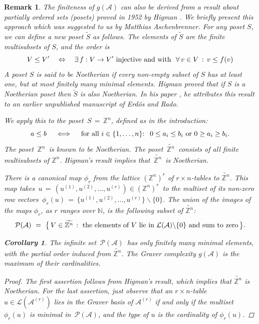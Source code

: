 \documentclass[11pt]{amsart}
\newtheorem{remark}[theorem]{Remark}
\newtheorem{corollary}[theorem]{Corollary}
\theoremstyle{definition}
\newcommand{\naturals}{{\mathbb N}}
\newcommand{\integers}{{\mathbb Z}}
\renewcommand{\L}{{\mathcal L}}
\renewcommand{\P}{{\mathcal P}}
\newcommand{\A}{{\mathcal A}}
\begin{document}
\begin{remark}
\rm
The finiteness of $g(\A)$ can also be
derived from a result about partially ordered
sets (posets) proved in 1952 by Higman \cite[Theorem 4.2]{Hig}.
We briefly present this approach which was suggested to us by
Matthias Aschenbrenner.
For any poset $S$, we can define a new poset
$\widetilde S$  as follows. The elements of $\widetilde S$
are the finite multisubsets of $S$, and the order is
  \begin{equation}
  \label{eqn:injectiveorder}
  V \le V'
  \quad \Leftrightarrow \quad
  \exists \,f: V\to V' \hbox{ injective and with }
\,\, \forall\, v \in V \,:\, v \le f(v)
  \end{equation}
A poset $S$ is said to be {\em Noetherian}
if every  non-empty subset of $S$  has
at least one, but at most finitely many minimal elements.
  Higman proved that  if $S$ is a Noetherian poset
then $\widetilde S$ is also Noetherian.
In his paper \cite{Hig}, he attributes this result to an earlier  
unpublished
manuscript of Erd\"os and Rado.

We apply this to the poset $\,S \,= \, \integers^n $,
defined as in the introduction:
$$ a \leq b \quad  \iff \quad
\hbox{for all $i \in \{1,\ldots,n\}$:
$ \,\,0 \leq a_i \leq b_i $ or $ 0 \geq a_i \geq b_i$}. $$
The poset $\,\integers^n \,$ is known to be Noetherian.
The  poset $\,\widetilde{\integers^n}\,$
consists of all finite multisubsets of $\integers^n$.
Higman's result implies that $\,\widetilde{\integers^n}\,$
is Noetherian.



There is a canonical map $\phi_r$ from the lattice $(\integers^n)^r$
of $r \times n$-tables to $\widetilde{\integers^n}$.
This map takes
$\,u\, = \, (u^{(1)} \! , u^{(2)} \!, \dots, u^{(r)}) \in  
(\integers^n)^r \,$
to the multiset of its non-zero row vectors
$\, \phi_r(u)\, = \,\bigl\{u^{(1)} \! ,
  u^{(2)} \!, \dots, u^{(r)}\bigr\}\backslash \{0\}$.
The union of the images of the maps $\phi_r$, as
$r$ ranges over $\naturals$, is the following subset of
$\widetilde{\integers^n}$:
$$ {\P (\A)}\,\, = \,\, \bigl\{ \,
V \in \widetilde{\integers^n} \,:\,\,
\hbox{the elements of $V$ lie in $\L(\A)\backslash\{0\}$ and
sum to zero} \,\bigr\}. $$
\begin{corollary}
The infinite set $\,{\P (\A)}\,$ has only finitely many
minimal elements, with the partial order induced
from $\widetilde{\integers^n}$.
The Graver complexity $g(\A)$ is the maximum
of their cardinalities.
\end{corollary}

\begin{proof}
The first assertion follows from Higman's result, which implies that
$\widetilde{\integers^n}$ is Noetherian. For the last assertion,
just observe that
an $r \times n$-table $u \in \L(\A^{(r)})$ lies in the Graver basis
of $\A^{(r)}$ if and only if the multiset
$\phi_r(u)$ is minimal in
$\,{\P (\A)} $, and
the type of $u$ is the cardinality of
$\phi_r(u)$.
\end{proof}

%

\end{remark}
\end{document}
